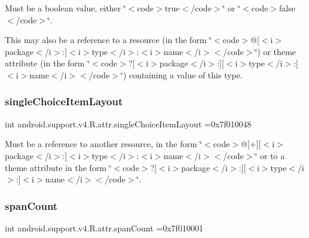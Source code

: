 Must be a boolean value, either \char`\"{}$<$code$>$true$<$/code$>$\char`\"{} or \char`\"{}$<$code$>$false$<$/code$>$\char`\"{}. 

This may also be a reference to a resource (in the form \char`\"{}$<$code$>$@\mbox{[}$<$i$>$package$<$/i$>$\+:\mbox{]}$<$i$>$type$<$/i$>$\+:$<$i$>$name$<$/i$>$$<$/code$>$\char`\"{}) or theme attribute (in the form \char`\"{}$<$code$>$?\mbox{[}$<$i$>$package$<$/i$>$\+:\mbox{]}\mbox{[}$<$i$>$type$<$/i$>$\+:\mbox{]}$<$i$>$name$<$/i$>$$<$/code$>$\char`\"{}) containing a value of this type. \mbox{\label{classandroid_1_1support_1_1v4_1_1R_1_1attr_a120fb3dc6f6858a1beef845f5ca49097}} 
\subsubsection{\texorpdfstring{single\+Choice\+Item\+Layout}{singleChoiceItemLayout}}
{\footnotesize\ttfamily int android.\+support.\+v4.\+R.\+attr.\+single\+Choice\+Item\+Layout =0x7f010048\hspace{0.3cm}{\ttfamily [static]}}

Must be a reference to another resource, in the form \char`\"{}$<$code$>$@\mbox{[}+\mbox{]}\mbox{[}$<$i$>$package$<$/i$>$\+:\mbox{]}$<$i$>$type$<$/i$>$\+:$<$i$>$name$<$/i$>$$<$/code$>$\char`\"{} or to a theme attribute in the form \char`\"{}$<$code$>$?\mbox{[}$<$i$>$package$<$/i$>$\+:\mbox{]}\mbox{[}$<$i$>$type$<$/i$>$\+:\mbox{]}$<$i$>$name$<$/i$>$$<$/code$>$\char`\"{}. \mbox{\label{classandroid_1_1support_1_1v4_1_1R_1_1attr_a980e39a37ab6c8e47c77242914200735}} 
\subsubsection{\texorpdfstring{span\+Count}{spanCount}}
{\footnotesize\ttfamily int android.\+support.\+v4.\+R.\+attr.\+span\+Count =0x7f010001\hspace{0.3cm}{\ttfamily [static]}}

